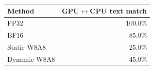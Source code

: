 \begin{tabular}{lr}
\toprule
Method & GPU$\leftrightarrow$CPU text match \\
\midrule
FP32 & 100.0\% \\
BF16 & 85.0\% \\
Static W8A8 & 25.0\% \\
Dynamic W8A8 & 45.0\% \\
\bottomrule
\end{tabular}
